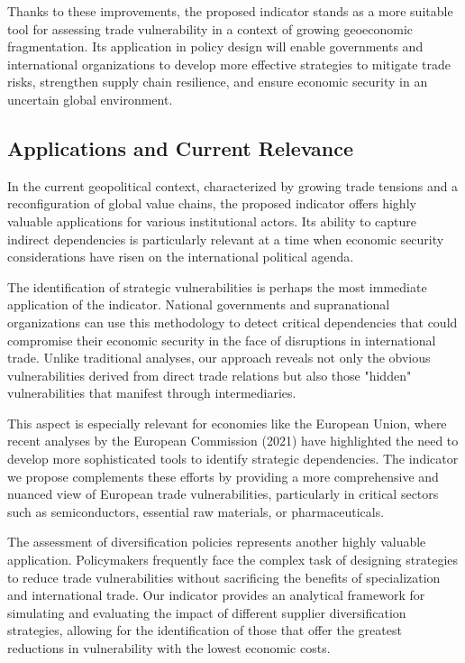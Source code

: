 \documentclass[final,1p,times,authoryear]{elsarticle}
\begin{document}
Thanks to these improvements, the proposed indicator stands as a more suitable tool for assessing trade vulnerability in a context of growing geoeconomic fragmentation. Its application in policy design will enable governments and international organizations to develop more effective strategies to mitigate trade risks, strengthen supply chain resilience, and ensure economic security in an uncertain global environment.

\subsection{Applications and Current Relevance}

In the current geopolitical context, characterized by growing trade tensions and a reconfiguration of global value chains, the proposed indicator offers highly valuable applications for various institutional actors. Its ability to capture indirect dependencies is particularly relevant at a time when economic security considerations have risen on the international political agenda.

The identification of strategic vulnerabilities is perhaps the most immediate application of the indicator. National governments and supranational organizations can use this methodology to detect critical dependencies that could compromise their economic security in the face of disruptions in international trade. Unlike traditional analyses, our approach reveals not only the obvious vulnerabilities derived from direct trade relations but also those "hidden" vulnerabilities that manifest through intermediaries.

This aspect is especially relevant for economies like the European Union, where recent analyses by the European Commission (2021) have highlighted the need to develop more sophisticated tools to identify strategic dependencies. The indicator we propose complements these efforts by providing a more comprehensive and nuanced view of European trade vulnerabilities, particularly in critical sectors such as semiconductors, essential raw materials, or pharmaceuticals.

The assessment of diversification policies represents another highly valuable application. Policymakers frequently face the complex task of designing strategies to reduce trade vulnerabilities without sacrificing the benefits of specialization and international trade. Our indicator provides an analytical framework for simulating and evaluating the impact of different supplier diversification strategies, allowing for the identification of those that offer the greatest reductions in vulnerability with the lowest economic costs.
\end{document}

